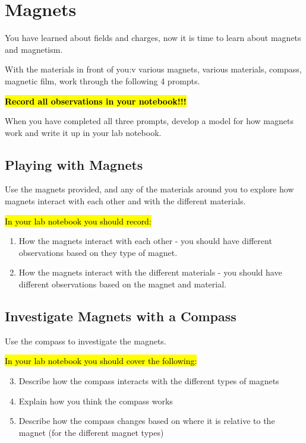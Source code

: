 \documentclass[14pt, fleqn, paper=letter, oneside]{scrartcl}
\begin{document}
\section{Magnets}
You have learned about fields and charges, now it is time to learn about magnets and magnetism.

With the materials in front of you:v
various magnets, various materials, compass, magnetic film,
work through the following 4 prompts.

\hl{\textbf{Record all observations in your notebook!!!}}

When you have completed all three prompts, develop a model for how magnets work and write it up in your lab notebook.

\subsection{Playing with Magnets}
Use the magnets provided, and any of the materials around you to explore how magnets interact with each other and with the different materials.

\hl{In your lab notebook you should record:}
\begin{enumerate}[nosep]
\item How the magnets interact with each other - you should have different observations based on they type of magnet.

\item How the magnets interact with the different materials - you should have different observations based on the magnet and material.
\end{enumerate}

\subsection{Investigate Magnets with a Compass}
Use the compass to investigate the magnets.

\hl{In your lab notebook you should cover the following:}
\begin{enumerate}[nosep]
\setcounter{enumi}{2}
\item Describe how the compass interacts with the different types of magnets
\item Explain how you think the compass works
\item Describe how the compass changes based on where it is relative to the magnet (for the different magnet types)
\end{enumerate}
\end{document}
